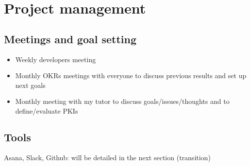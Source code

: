 \section{Project management}
\label{sec:management}

\subsection{Meetings and goal setting}
\label{ssec:meetings}

\begin{itemize}
    \item Weekly developers meeting
    \item Monthly OKRs meetings with everyone to discuss previous results and set up next goals
    \item Monthly meeting with my tutor to discuss goals/issues/thoughts and to define/evaluate PKIs
\end{itemize}

\subsection{Tools}
\label{ssec:tools}

Asana, Slack, Github: will be detailed in the next section (transition)
